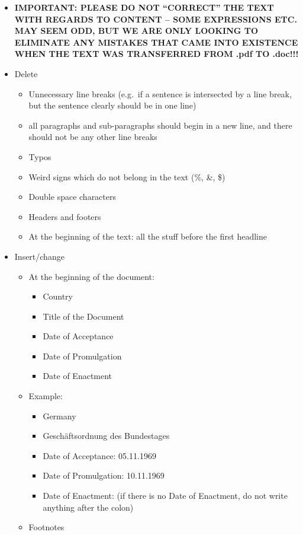 \documentclass[10pt,]{article}
\providecommand{\tightlist}{%
  \setlength{\itemsep}{0pt}\setlength{\parskip}{0pt}}
\begin{document}
\begin{itemize}
\tightlist
\item
  \textbf{IMPORTANT: PLEASE DO NOT ``CORRECT'' THE TEXT WITH REGARDS TO
  CONTENT -- SOME EXPRESSIONS ETC. MAY SEEM ODD, BUT WE ARE ONLY LOOKING
  TO ELIMINATE ANY MISTAKES THAT CAME INTO EXISTENCE WHEN THE TEXT WAS
  TRANSFERRED FROM .pdf TO .doc!!!}
\item
  Delete

  \begin{itemize}
  \tightlist
  \item
    Unnecessary line breaks (e.g.~if a sentence is intersected by a line
    break, but the sentence clearly should be in one line)
  \item
    all paragraphs and sub-paragraphs should begin in a new line, and
    there should not be any other line breaks
  \item
    Typos
  \item
    Weird signs which do not belong in the text (\%, \&, \$)
  \item
    Double space characters
  \item
    Headers and footers
  \item
    At the beginning of the text: all the stuff before the first
    headline
  \end{itemize}
\item
  Insert/change

  \begin{itemize}
  \tightlist
  \item
    At the beginning of the document:

    \begin{itemize}
    \tightlist
    \item
      Country
    \item
      Title of the Document
    \item
      Date of Acceptance
    \item
      Date of Promulgation
    \item
      Date of Enactment
    \end{itemize}
  \item
    Example:

    \begin{itemize}
    \tightlist
    \item
      Germany
    \item
      Geschäftsordnung des Bundestages
    \item
      Date of Acceptance: 05.11.1969
    \item
      Date of Promulgation: 10.11.1969
    \item
      Date of Enactment: (if there is no Date of Enactment, do not write
      anything after the colon)
    \end{itemize}
  \item
    Footnotes


\end{itemize}
\end{itemize}
\end{document}

